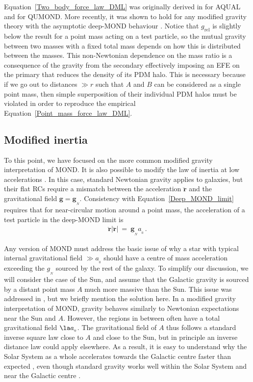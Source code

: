 \documentclass[fleqn,usenatbib,useAMS,onecolumn]{mnras} %
\begin{document}
Equation~\ref{Two_body_force_law_DML} was originally derived in \citet{Milgrom_1994_virial} for AQUAL and \citet{QUMOND} for QUMOND. More recently, it was shown to hold for any modified gravity theory with the asymptotic deep-MOND behaviour \citep{Milgrom_2014}. Notice that $g_\text{rel}$ is slightly below the result for a point mass acting on a test particle, so the mutual gravity between two masses with a fixed total mass depends on how this is distributed between the masses. This non-Newtonian dependence on the mass ratio is a consequence of the gravity from the secondary effectively imposing an EFE on the primary that reduces the density of its PDM halo. This is necessary because if we go out to distances $\gg r$ such that $A$ and $B$ can be considered as a single point mass, then simple superposition of their individual PDM halos must be violated in order to reproduce the empirical Equation~\ref{Point_mass_force_law_DML}.



\subsection{Modified inertia}
\label{Modified_inertia}

To this point, we have focused on the more common modified gravity interpretation of MOND. It is also possible to modify the law of inertia at low accelerations \citep{Milgrom_1994}. In this case, standard Newtonian gravity applies to galaxies, but their flat RCs require a mismatch between the acceleration $\ddot{\bm{r}}$ and the gravitational field $\bm{g} = \bm{g}_{_N}$. Consistency with Equation~\ref{Deep_MOND_limit} requires that for near-circular motion around a point mass, the acceleration of a test particle in the deep-MOND limit is
\begin{eqnarray}
	\ddot{\bm{r}}  \left| \ddot{\bm{r}} \right| ~=~ \bm{g}_{_N} a_{_0} \, .
\end{eqnarray}

Any version of MOND must address the basic issue of why a star with typical internal gravitational field $\gg a_{_0}$ should have a centre of mass acceleration exceeding the $g_{_N}$ sourced by the rest of the galaxy. To simplify our discussion, we will consider the case of the Sun, and assume that the Galactic gravity is sourced by a distant point mass $A$ much more massive than the Sun. This issue was addressed in \citet{Bekenstein_Milgrom_1984}, but we briefly mention the solution here. In a modified gravity interpretation of MOND, gravity behaves similarly to Newtonian expectations near the Sun and $A$. However, the regions in between often have a total gravitational field $\la a_{_0}$. The gravitational field of $A$ thus follows a standard inverse square law close to $A$ and close to the Sun, but in principle an inverse distance law could apply elsewhere. As a result, it is easy to understand why the Solar System as a whole accelerates towards the Galactic centre faster than expected \citep{McGaugh_2018, Klioner_2021}, even though standard gravity works well within the Solar System \citep{Hees_2014, Hees_2016} and near the Galactic centre \citep{Gravity_2018, Gravity_2020}.
\end{document}
